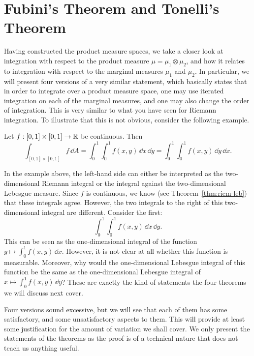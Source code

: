 \section{Fubini's Theorem and Tonelli's Theorem}

Having constructed the product measure spaces, we take a closer look at integration with respect to the product measure $\mu = \mu_1 \otimes \mu_2$, and how it relates to integration with respect to the marginal measures $\mu_1$ and $\mu_2$. In particular, we will present four versions of a very similar statement, which basically states that in order to integrate over a product measure space, one may use iterated integration on each of the marginal measures, and one may also change the order of integration. This is very similar to what you have seen for Riemann integration. To illustrate that this is not obvious, consider the following example.

\begin{example}
	Let $f: [0,1]\times[0,1] \to \mathbb R$ be continuous. Then  
	\[
	\int_{[0,1]\times[0,1]} f\, \dd A = \int_0^1\!\! \int_0^1 f(x,y)\, \dd x\, \dd y = \int_0^1\!\! \int_0^1 f(x,y)\, \dd y \,\dd x.
	\]	
\end{example}

In the example above, the left-hand side can either be interpreted as the two-dimensional Riemann integral or the integral against the two-dimensional Lebesgue measure. Since $f$ is continuous, we know (see Theorem~\ref{thm:riem-leb}) that these integrals agree. However, the two integrals to the right of this two-dimensional integral are different. Consider the first:
\[
	\int_0^1\!\! \int_0^1 f(x,y)\, \dd x\, \dd y.
\]
This can be seen as the one-dimensional integral of the function $y \mapsto \int_0^1 f(x,y)\, \dd x$. However, it is not clear at all whether this function is measurable. Moreover, why would the one-dimensional Lebesgue integral of this function be the same as the one-dimensional Lebesgue integral of $x \mapsto \int_0^1 f(x,y)\, \dd y$? These are exactly the kind of statements the four theorems we will discuss next cover.

Four versions sound excessive, but we will see that each of them has some satisfactory, and some unsatisfactory aspects to them. This will provide at least some justification for the amount of variation we shall cover. We only present the statements of the theorems as the proof is of a technical nature that does not teach us anything useful. 

